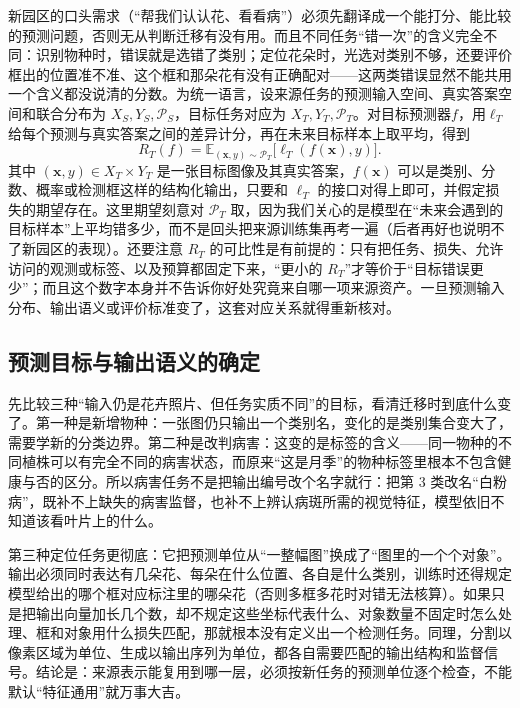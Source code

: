 新园区的口头需求（“帮我们认认花、看看病”）必须先翻译成一个能打分、能比较的预测问题，否则无从判断迁移有没有用。而且不同任务“错一次”的含义完全不同：识别物种时，错误就是选错了类别；定位花朵时，光选对类别不够，还要评价框出的位置准不准、这个框和那朵花有没有正确配对——这两类错误显然不能共用一个含义都没说清的分数。为统一语言，设来源任务的预测输入空间、真实答案空间和联合分布为 $X_S,Y_S,\mathcal P_S$，目标任务对应为 $X_T,Y_T,\mathcal P_T$。对目标预测器$f$，用$\ell_T$给每个预测与真实答案之间的差异计分，再在未来目标样本上取平均，得到
\begin{equation}
  R_T(f)=\mathbb E_{(\bm{x},y)\sim\mathcal P_T}
  \bigl[\ell_T(f(\bm{x}),y)\bigr].
  \label{eq:ket-transfer-target-risk}
\end{equation}
其中 $(\bm x,y)\in X_T\times Y_T$ 是一张目标图像及其真实答案，$f(\bm x)$ 可以是类别、分数、概率或检测框这样的结构化输出，只要和 $\ell_T$ 的接口对得上即可，并假定损失的期望存在。这里期望刻意对 $\mathcal P_T$ 取，因为我们关心的是模型在“未来会遇到的目标样本”上平均错多少，而不是回头把来源训练集再考一遍（后者再好也说明不了新园区的表现）。还要注意 $R_T$ 的可比性是有前提的：只有把任务、损失、允许访问的观测或标签、以及预算都固定下来，“更小的 $R_T$”才等价于“目标错误更少”；而且这个数字本身并不告诉你好处究竟来自哪一项来源资产。一旦预测输入分布、输出语义或评价标准变了，这套对应关系就得重新核对。

\subsection{预测目标与输出语义的确定}
\label{sec:ket-transfer-output-semantics}

先比较三种“输入仍是花卉照片、但任务实质不同”的目标，看清迁移时到底什么变了。第一种是新增物种：一张图仍只输出一个类别名，变化的是类别集合变大了，需要学新的分类边界。第二种是改判病害：这变的是标签的含义——同一物种的不同植株可以有完全不同的病害状态，而原来“这是月季”的物种标签里根本不包含健康与否的区分。所以病害任务不是把输出编号改个名字就行：把第 3 类改名“白粉病”，既补不上缺失的病害监督，也补不上辨认病斑所需的视觉特征，模型依旧不知道该看叶片上的什么。

第三种定位任务更彻底：它把预测单位从“一整幅图”换成了“图里的一个个对象”。输出必须同时表达有几朵花、每朵在什么位置、各自是什么类别，训练时还得规定模型给出的哪个框对应标注里的哪朵花（否则多框多花时对错无法核算）。如果只是把输出向量加长几个数，却不规定这些坐标代表什么、对象数量不固定时怎么处理、框和对象用什么损失匹配，那就根本没有定义出一个检测任务。同理，分割以像素区域为单位、生成以输出序列为单位，都各自需要匹配的输出结构和监督信号。结论是：来源表示能复用到哪一层，必须按新任务的预测单位逐个检查，不能默认“特征通用”就万事大吉。

